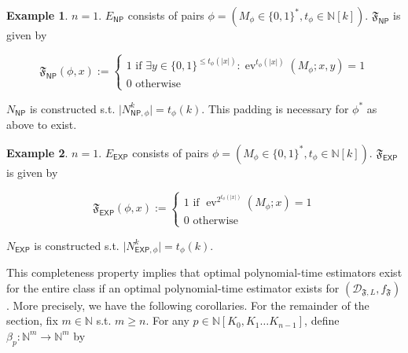 \documentclass{article}
\numberwithin{equation}{section}
\theoremstyle{definition}
\newtheorem{example}{Example}[section]
\theoremstyle{plain}
\newcommand{\Bool}{\{0,1\}}
\newcommand{\Words}{{\Bool^*}}
\DeclareMathOperator{\Ev}{ev}
\newcommand{\Nats}{\mathbb{N}}
\newcommand{\NatPoly}{\Nats[K_0, K_1 \ldots K_{n-1}]}
\newcommand{\Abs}[1]{\lvert #1 \rvert}
\newcommand{\Dist}{\mathcal{D}}
\begin{document}
\begin{samepage}
\begin{example}

${n = 1}$. ${E_{\mathsf{NP}}}$ consists of pairs ${\phi=(M_\phi \in \Words, t_\phi \in \Nats[k])}$. ${\mathfrak{F}_{\mathsf{NP}}}$ is given by 

\begin{equation}
\mathfrak{F}_{\mathsf{NP}}(\phi,x):=\begin{cases}1 \text{ if } \exists y\in \Bool^{\leq t_\phi(\Abs{x})}: \Ev^{ t_\phi(\Abs{x})}(M_\phi;x,y)=1 \\ 0 \text { otherwise} \end{cases}
\end{equation}

${N_{\mathsf{NP}}}$ is constructed s.t. ${\Abs{N_{\mathsf{NP},\phi}^k}=t_\phi(k)}$. This padding is necessary for ${\phi^*}$ as above to exist. 

\end{example}
\end{samepage}

\begin{samepage}
\begin{example}

${n = 1}$. ${E_{\mathsf{EXP}}}$ consists of pairs ${\phi=(M_\phi \in \Words, t_\phi \in \Nats[k])}$. ${\mathfrak{F}_{\mathsf{EXP}}}$ is given by 

\begin{equation}
\mathfrak{F}_{\mathsf{EXP}}(\phi,x):=\begin{cases}1 \text{ if } \Ev^{2^{t_\phi(\Abs{x})}}(M_\phi;x)=1 \\ 0 \text { otherwise} \end{cases}
\end{equation}

${N_{\mathsf{EXP}}}$ is constructed s.t. ${\Abs{N_{\mathsf{EXP},\phi}^k}=t_\phi(k)}$.

\end{example}
\end{samepage}

This completeness property implies that optimal polynomial-time estimators exist for the entire class if an optimal polynomial-time estimator exists for ${(\Dist_{\mathfrak{F},L},f_{\mathfrak{F}})}$. More precisely, we have the following corollaries. For the remainder of the section, fix ${m \in \Nats}$ s.t. ${m \geq n}$. For any ${p \in \NatPoly}$, define ${\beta_p: \Nats^m \rightarrow \Nats^m}$ by 
\end{document}
